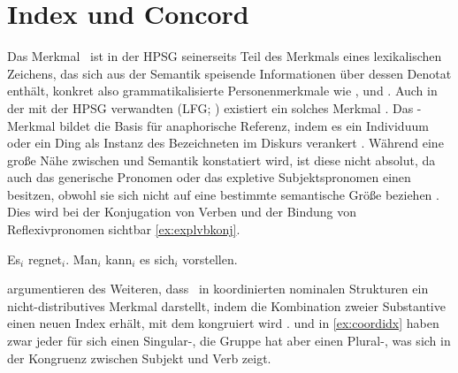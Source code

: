 \section{Index und Concord}
\label{sec:indexconcord}

\label{phsec:index}
Das Merkmal \Index\ ist in der HPSG seinerseits Teil des Merkmals
 eines lexikalischen Zeichens, das sich aus der Semantik
speisende Informationen über dessen Denotat enthält, konkret also
grammatikalisierte Personenmerkmale wie ,
 und 
\citep[15--17]{wechslerzlatic2003}. Auch in der mit der HPSG verwandten
 (LFG;
\cites{kaplanbresnan1982}{bresnan2001}{bresnanetal2016}) existiert ein solches
Merkmal \citep[189--190]{bresnanetal2016}. Das \Index-Merkmal bildet die Basis
für anaphorische Referenz, indem es ein Individuum oder ein Ding als Instanz
des Bezeichneten im Diskurs verankert \citep[10--11]{wechslerzlatic2003}.
Während eine große Nähe zwischen \Index{} und Semantik konstatiert wird, ist
diese nicht absolut, da auch das generische Pronomen  oder das
expletive Subjektspronomen  einen \Index{} besitzen, obwohl sie sich
nicht auf eine bestimmte semantische Größe beziehen
\citep[11--13]{wechslerzlatic2003}. Dies wird bei der Konjugation von Verben
und der Bindung von Reflexivpronomen sichtbar \cref{ex:explvbkonj}.

\begin{exe}
\ex \label{ex:explvbkonj}
	\begin{xlist}
	\ex Es$_i$ regnet$_i$.
	\ex Man$_i$ kann$_i$ es sich$_i$ vorstellen.
	\end{xlist}
\end{exe}

\citet{kingdalrymple2004} argumentieren des Weiteren, dass \Index\ in
koordinierten nominalen Strukturen ein nicht-distributives Merkmal darstellt,
indem die Kombination zweier Substantive einen neuen Index erhält, mit dem
kongruiert wird \citep[74--76]{kingdalrymple2004}.  und  in
\cref{ex:coordidx} haben zwar jeder für sich einen Singular-\Index, die Gruppe
 hat aber einen Plural-\Index, was sich in der
Kongruenz zwischen Subjekt und Verb zeigt.

